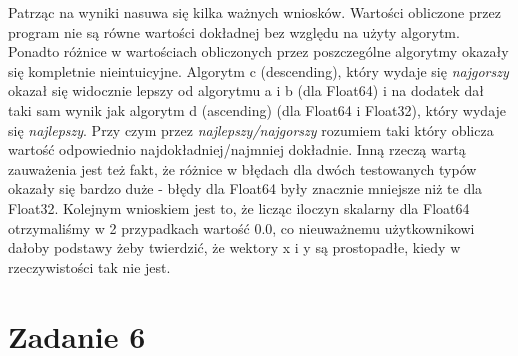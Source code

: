 \documentclass[]{article}
\begin{document}
	Patrząc na wyniki nasuwa się kilka ważnych wniosków. Wartości obliczone przez program nie są równe wartości dokładnej bez względu na użyty algorytm. Ponadto różnice w wartościach obliczonych przez poszczególne algorytmy okazały się kompletnie nieintuicyjne. Algorytm c (descending), który wydaje się \textit{najgorszy} okazał się widocznie lepszy od algorytmu a i b (dla Float64) i na dodatek dał taki sam wynik jak algorytm d (ascending) (dla Float64 i Float32), który wydaje się \textit{najlepszy}. Przy czym przez \textit{najlepszy/najgorszy} rozumiem taki który oblicza wartość odpowiednio najdokładniej/najmniej dokładnie. \newline
	Inną rzeczą wartą zauważenia jest też fakt, że różnice w błędach dla dwóch testowanych typów okazały się bardzo duże - błędy dla Float64 były znacznie mniejsze niż te dla Float32.
	Kolejnym wnioskiem jest to, że licząc iloczyn skalarny dla Float64 otrzymaliśmy w 2 przypadkach wartość 0.0, co nieuważnemu użytkownikowi dałoby podstawy żeby twierdzić, że wektory x i y są prostopadłe, kiedy w rzeczywistości tak nie jest. 
	\clearpage

	\section*{Zadanie 6}
	
\end{document}

